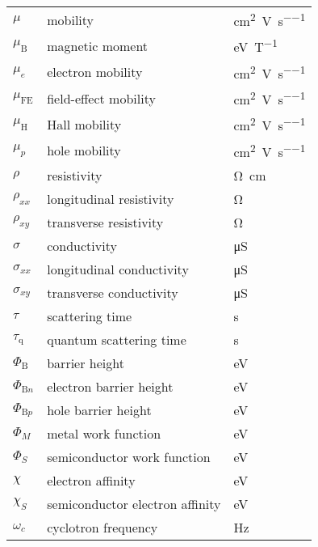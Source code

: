 \begin{longtable}[l]{p{125pt} p{150pt} p{150pt}}
	$\mu$ & mobility & \si{\cm\squared\per\volt\per\second}\\
	$\mu_\mathrm{B}$ & magnetic moment & \si{\electronvolt\per\tesla}\\
	$\mu_e$ & electron mobility & \si{\cm\squared\per\volt\per\second}\\
	$\mu_\mathrm{FE}$ & field-effect mobility & \si{\cm\squared\per\volt\per\second}\\
	$\mu_\mathrm{H}$ & Hall mobility & \si{\cm\squared\per\volt\per\second}\\
	$\mu_p$ & hole mobility & \si{\cm\squared\per\volt\per\second}\\
	$\rho$ & resistivity & \si{\ohm\cm}\\
	$\rho_{xx}$ & longitudinal resistivity & \si{\ohm}\\
	$\rho_{xy}$ & transverse resistivity & \si{\ohm}\\
	$\sigma$ & conductivity & \si{\micro\siemens} \\
	$\sigma_{xx}$ & longitudinal conductivity & \si{\micro\siemens}\\
	$\sigma_{xy}$ & transverse conductivity & \si{\micro\siemens}\\
	$\tau$ & scattering time & \si{\second}\\
	$\tau_\mathrm{q}$ & quantum scattering time & \si{\second}\\
	$\Phi_\mathrm{B}$ & barrier height & \si{\electronvolt}\\
	$\Phi_{\mathrm{B}n}$ & electron barrier height & \si{\electronvolt}\\
	$\Phi_{\mathrm{B}p}$ & hole barrier height & \si{\electronvolt}\\
	$\Phi_M$ & metal work function & \si{\electronvolt}\\
	$\Phi_S$ & semiconductor work function & \si{\electronvolt}\\
	$\chi$ & electron affinity & \si{\electronvolt}\\
	$\chi_S$ & semiconductor electron affinity & \si{\electronvolt}\\
	$\omega_{c}$ & cyclotron frequency & \si{\hertz}\\
\bottomrule
\end{longtable}


%
